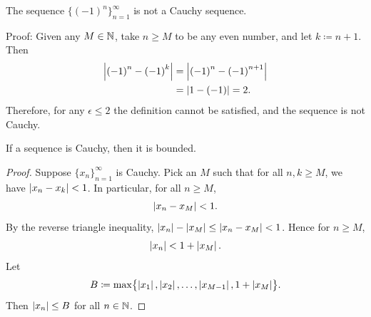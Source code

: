 \begin{example}
The sequence $\bigl\{ {(-1)}^n \bigr\}_{n=1}^\infty$ is not a Cauchy sequence.

Proof:
Given any $M \in {\mathbb{N}}$, take $n \geq M$ to be any even number, and
let $k \coloneqq n+1$.  Then
\begin{equation*}
\begin{split}
\left\lvert {{(-1)}^n - {(-1)}^k} \right\rvert
& =
\left\lvert {{(-1)}^n - {(-1)}^{n+1}} \right\rvert
\\
& =
\left\lvert {1 - (-1)} \right\rvert = 2 .
\end{split}
\end{equation*}
Therefore, for any $\epsilon \leq 2$ the definition cannot be satisfied, and
the sequence is not Cauchy.
\end{example}

%

\begin{prop}
If a sequence is Cauchy, then it is bounded.
\end{prop}

\begin{proof}
Suppose $\{ x_n \}_{n=1}^\infty$ is Cauchy.  Pick an $M$ such that for all
$n,k \geq M$, we have $\left\lvert {x_n-x_k} \right\rvert < 1$.  In particular, 
for all $n \geq M$,
\begin{equation*}
\left\lvert {x_n - x_M} \right\rvert < 1 .
\end{equation*}
By the reverse triangle inequality,
$\left\lvert {x_n} \right\rvert - \left\lvert {x_M} \right\rvert \leq \left\lvert {x_n - x_M} \right\rvert < 1$.  Hence for $n \geq M$,
\begin{equation*}
\left\lvert {x_n} \right\rvert < 1 + \left\lvert {x_M} \right\rvert.
\end{equation*}
Let
\begin{equation*}
B \coloneqq \max \bigl\{ \left\lvert {x_1} \right\rvert, \left\lvert {x_2} \right\rvert, \ldots, \left\lvert {x_{M-1}} \right\rvert, 1+ \left\lvert {x_M} \right\rvert \bigr\} .
\end{equation*}
Then $\left\lvert {x_n} \right\rvert \leq B$ for all $n \in {\mathbb{N}}$.
\end{proof}

